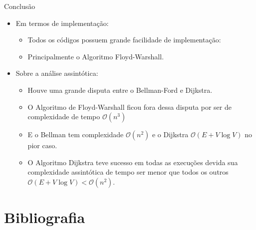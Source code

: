 \documentclass[aspectratio=169]{beamer}
\begin{document}
	\begin{frame}{Conclusão}
		\begin{itemize}
			\item Em termos de implementação:
			\begin{itemize}
				\item Todos os códigos possuem grande facilidade de implementação:
				
				\item Principalmente o Algoritmo Floyd-Warshall.
			\end{itemize}
			
			\bigskip
			
			\item Sobre a análise assintótica:
			\begin{itemize}
				\item Houve uma grande disputa entre o Bellman-Ford e Dijkstra. 
				
				\item O Algoritmo de Floyd-Warshall ficou fora dessa disputa por ser de complexidade de tempo  $\mathcal{O}(n^3)$
				
				\item E o Bellman tem complexidade  $\mathcal{O}(n^2)$ e o Dijkstra $\mathcal{O}(E + V \log V)$ no pior caso. 
				
				\item O Algoritmo Dijkstra teve sucesso em todas as execuções devida sua complexidade assintótica de tempo ser menor que todos os outros $\mathcal{O}(E + V \log V) < \mathcal{O}(n^2)$.
			\end{itemize}
		\end{itemize}
	\end{frame}


\section{Bibliografia}




\maketitle
\end{document}
